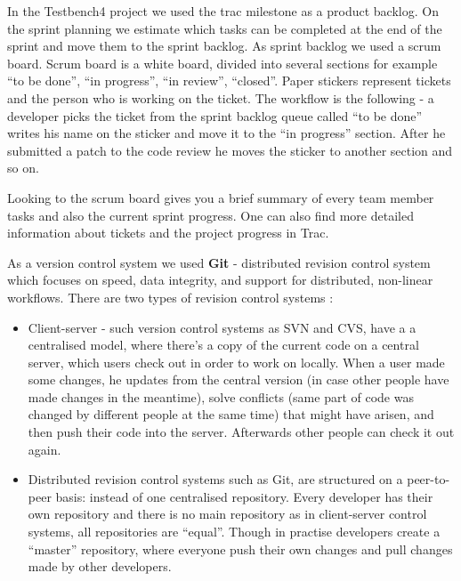   In the Testbench4 project we used the trac milestone as a product backlog. On
  the sprint planning we estimate which tasks can be completed at the end of the sprint 
  and move them to the sprint backlog. As sprint backlog we used a scrum board.
  Scrum board is a white board, divided into several sections for example ``to be done'', ``in progress'', ``in review'',
  ``closed''. Paper stickers represent tickets and the person who is working on
  the ticket. The workflow is the following - a developer picks the
  ticket from the sprint backlog queue called ``to be done'' 
  writes his name on the sticker and move it to the ``in progress'' section.
  After he submitted a patch to the code review he moves the sticker to another
  section and so on.
  
  Looking to the scrum board gives you a brief summary of every team member tasks and 
  also the current sprint progress. One can also find more detailed information
  about tickets and the project progress in Trac.
 
  
  As a version control system we used \textbf{Git} - distributed revision control system
  which focuses on speed, data integrity, and support for distributed,
  non-linear workflows. There are two types of revision control systems :
  
   \begin{itemize}
   \item Client-server - such version control systems as SVN and CVS, have a 
    a centralised model, where there's a copy of the current code on a central
    server, which users check out in order to work on locally. When a user made
    some changes, he updates from the central version (in case other people have
    made changes in the meantime), solve conflicts (same part of code was
    changed by different people at the same time) that might have arisen, and
    then push their code into the server. Afterwards other people can check it out again.

   \item Distributed revision control systems such as Git, are structured on a
    peer-to-peer basis: instead of one centralised repository. Every developer
    has their own repository and there is no main repository as in client-server
    control systems, all repositories are ``equal''. Though in practise developers
    create a ``master'' repository, where everyone push their own changes and pull
    changes made by other developers.
  \end{itemize}
  
